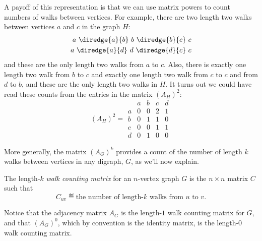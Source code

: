A payoff of this representation is that we can use matrix powers to
count numbers of walks between vertices.  For example, there are two
length two walks between vertices $a$ and $c$ in the graph $H$:
\begin{align*}
a\ \diredge{a}{b}\ b\ \diredge{b}{c}\  c\\
a\ \diredge{a}{d}\ d\ \diredge{d}{c}\ c
\end{align*}
and these are the only length two walks from $a$ to $c$.  Also, there is
exactly one length two walk from $b$ to $c$ and exactly one length two
walk from $c$ to $c$ and from $d$ to $b$, and these are the only
length two walks in $H$.  It turns out we could have read these counts
from the entries in the matrix $(A_H)^2$:
\[
(A_H)^2 = \begin{array}{c|cccc|}
  &  a & b & c & d \\ \hline
a &  0 & 0 & 2 & 1 \\
b &  0 & 1 & 1 & 0 \\
c &  0 & 0 & 1 & 1 \\
d &  0 & 1 & 0 & 0
\end{array}
\]

\iffalse
If $G$ is a weighted graph with edge weights given by $w: E \to
\reals$, then the adjacency matrix for~$G$ is $A_G = \{ a_{ij} \}$
where
\begin{equation*}
    a_{ij} = \begin{cases}
                w(\edge{v_i}{v_j}) & \text{if $\edge{v_i}{v_j} \in E$} \\
                0                 & \text{otherwise.}
              \end{cases}
\end{equation*}
\end{definition}

For example, Figure~\ref{fig:adjacency_matrix} displays the adjacency
matrices for the graphs shown in Figures~\ref{fig:isomorphism}(a)
and~\ref{fig:weighted_graph} where $v_1 = a$, $v_2 = b$, $v_3 = c$,
and $v_4 = d$.
\fi

More generally, the matrix $(A_G)^k$ provides a count of the number of
length $k$ walks between vertices in any digraph, $G$, as we'll now
explain.

\begin{definition}
  The length-$k$ \emph{walk counting matrix}%
%
for an $n$-vertex graph $G$ is the $n \times n$ matrix $C$ such that
\begin{equation}\label{def:walk_matrix}
C_{uv} \eqdef \text{the number of length-$k$ walks from $u$ to $v$}.
\end{equation}
\end{definition}
Notice that the adjacency matrix $A_G$ is the length-$1$ walk counting
matrix for $G$, and that $(A_G)^0$, which by convention is the identity
matrix, is the length-0 walk counting matrix.

